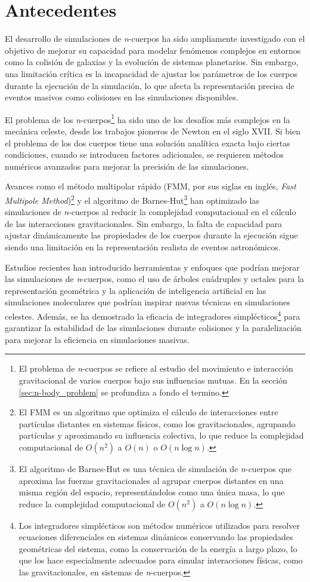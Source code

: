 \section{Antecedentes}
El desarrollo de simulaciones de \textit{n}-cuerpos ha sido ampliamente investigado con el objetivo de mejorar su capacidad para modelar fenómenos complejos en entornos como la colisión de galaxias y la evolución de sistemas planetarios. Sin embargo, una limitación crítica es la incapacidad de ajustar los parámetros de los cuerpos durante la ejecución de la simulación, lo que afecta la representación precisa de eventos masivos como colisiones en las simulaciones disponibles.

El problema de los \textit{n}-cuerpos\footnote{El problema de \textit{n}-cuerpos se refiere al estudio del movimiento e interacción gravitacional de varios cuerpos bajo sus influencias mutuas. En la sección \ref{sec:n-body_problem} se profundiza a fondo el termino.} ha sido uno de los desafíos más complejos en la mecánica celeste, desde los trabajos pioneros de Newton en el siglo XVII. Si bien el problema de los dos cuerpos tiene una solución analítica exacta bajo ciertas condiciones, cuando se introducen factores adicionales, se requieren métodos numéricos avanzados para mejorar la precisión de las simulaciones.

Avances como el método multipolar rápido (FMM, por sus siglas en inglés, \textit{Fast Multipole Method})\footnote{El FMM es un algoritmo que optimiza el cálculo de interacciones entre partículas distantes en sistemas físicos, como los gravitacionales, agrupando partículas y aproximando su influencia colectiva, lo que reduce la complejidad computacional de \(O(n^2)\) a \(O(n)\) o \(O(n \log n)\).} y el algoritmo de Barnes-Hut\footnote{El algoritmo de Barnes-Hut es una técnica de simulación de \textit{n}-cuerpos que aproxima las fuerzas gravitacionales al agrupar cuerpos distantes en una misma región del espacio, representándolos como una única masa, lo que reduce la complejidad computacional de \(O(n^2)\) a \(O(n \log n)\).} han optimizado las simulaciones de \textit{n}-cuerpos al reducir la complejidad computacional en el cálculo de las interacciones gravitacionales. Sin embargo, la falta de capacidad para ajustar dinámicamente las propiedades de los cuerpos durante la ejecución sigue siendo una limitación en la representación realista de eventos astronómicos.

Estudios recientes han introducido herramientas y enfoques que podrían mejorar las simulaciones de \textit{n}-cuerpos, como el uso de árboles cuádruples y octales para la representación geométrica y la aplicación de inteligencia artificial en las simulaciones moleculares que podrían inspirar nuevas técnicas en simulaciones celestes. Además, se ha demostrado la eficacia de integradores simplécticos\footnote{Los integradores simplécticos son métodos numéricos utilizados para resolver ecuaciones diferenciales en sistemas dinámicos conservando las propiedades geométricas del sistema, como la conservación de la energía a largo plazo, lo que los hace especialmente adecuados para simular interacciones físicas, como las gravitacionales, en sistemas de \textit{n}-cuerpos.} para garantizar la estabilidad de las simulaciones durante colisiones y la paralelización para mejorar la eficiencia en simulaciones masivas.